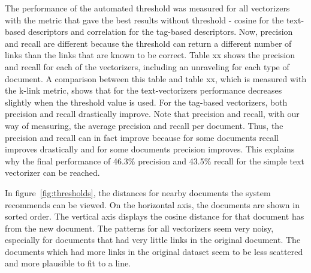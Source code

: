 The performance of the automated threshold was measured for all vectorizers with the metric that gave the best results without threshold - cosine for the text-based descriptors and correlation for the tag-based descriptors. Now, precision and recall are different because the threshold can return a different number of links than the links that are known to be correct. Table xx shows the precision and recall for each of the vectorizers, including an unraveling for each type of document. A comparison between this table and table xx, which is measured with the k-link metric, shows that for the text-vectorizers performance decreases slightly when the threshold value is used. %
For the tag-based vectorizers, both precision and recall drastically improve. Note that precision and recall, with our way of measuring, the average precision and recall per document. Thus, the precision and recall can in fact improve because for some documents recall improves drastically and for some documents precision improves. This explains why the final performance of 46.3\% precision and 43.5\% recall for the simple text vectorizer can be reached. %

In figure~\ref{fig:thresholds}, the distances for nearby documents the system recommends can be viewed. On the horizontal axis, the documents are shown in sorted order. The vertical axis displays the cosine distance for that document has from the new document. The patterns for all vectorizers seem very noisy, especially for documents that had very little links in the original document. The documents which had more links in the original dataset seem to be less scattered and more plausible to fit to a line.

